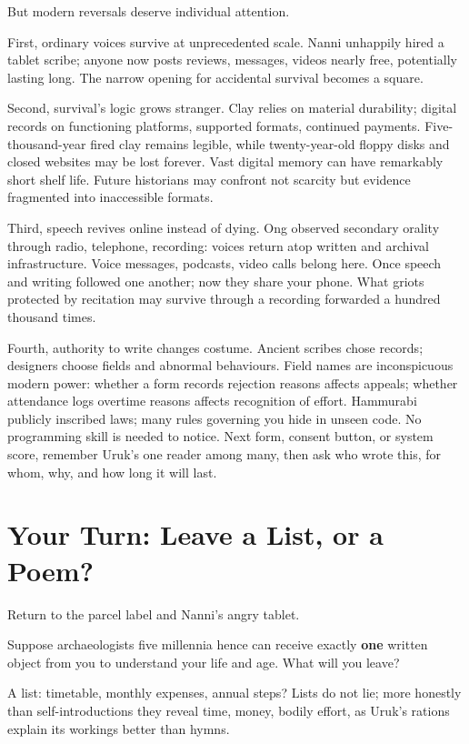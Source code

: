 But modern reversals deserve individual attention.

First, ordinary voices survive at unprecedented scale. Nanni unhappily hired a tablet scribe; anyone now posts reviews, messages, videos nearly free, potentially lasting long. The narrow opening for accidental survival becomes a square.

Second, survival's logic grows stranger. Clay relies on material durability; digital records on functioning platforms, supported formats, continued payments. Five-thousand-year fired clay remains legible, while twenty-year-old floppy disks and closed websites may be lost forever. Vast digital memory can have remarkably short shelf life. Future historians may confront not scarcity but evidence fragmented into inaccessible formats.

Third, speech revives online instead of dying. Ong observed secondary orality through radio, telephone, recording: voices return atop written and archival infrastructure. Voice messages, podcasts, video calls belong here. Once speech and writing followed one another; now they share your phone. What griots protected by recitation may survive through a recording forwarded a hundred thousand times.

Fourth, authority to write changes costume. Ancient scribes chose records; designers choose fields and abnormal behaviours. Field names are inconspicuous modern power: whether a form records rejection reasons affects appeals; whether attendance logs overtime reasons affects recognition of effort. Hammurabi publicly inscribed laws; many rules governing you hide in unseen code. No programming skill is needed to notice. Next form, consent button, or system score, remember Uruk's one reader among many, then ask who wrote this, for whom, why, and how long it will last.

\section{Your Turn: Leave a List, or a Poem?}
Return to the parcel label and Nanni's angry tablet.

Suppose archaeologists five millennia hence can receive exactly \textbf{one} written object from you to understand your life and age. What will you leave?

A list: timetable, monthly expenses, annual steps? Lists do not lie; more honestly than self-introductions they reveal time, money, bodily effort, as Uruk's rations explain its workings better than hymns.


